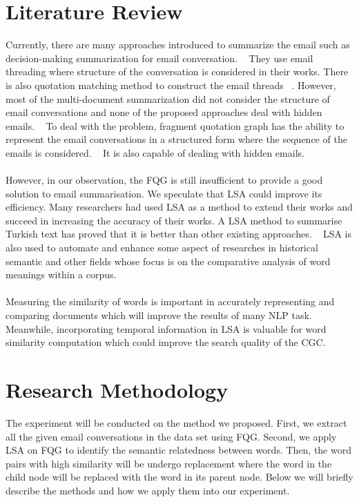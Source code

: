 \documentclass[a4paper, 12pt]{article}
\begin{document}
\section*{Literature Review}
Currently, there are many approaches introduced to summarize the email such as decision-making summarization for email conversation. ~\cite{Wan2004} They use email threading where structure of the conversation is considered in their works. There is also quotation matching method to construct the email threads ~\cite{yeh2006}. However, most of the multi-document summarization did not consider the structure of email conversations and none of the proposed approaches deal with hidden emails. ~\cite{Carenini2007} To deal with the problem, fragment quotation graph has the ability to represent the email conversations in a structured form where the sequence of the emails is considered. ~\cite{Carenini2005} It is also capable of dealing with hidden emails.
\\ \\
However, in our observation, the FQG is still insufficient to provide a good solution to email summarisation. We speculate that LSA could improve its efficiency. Many researchers had used LSA as a method to extend their works and succeed in increasing the accuracy of their works. A LSA method to summarise Turkish text has proved that it is better than other existing approaches. ~\cite{Makbule2010} LSA is also used to automate and enhance some aspect of researches in historical semantic and other fields whose focus is on the comparative analysis of word meanings within a corpus. ~\cite{Sagi2009}
\\ \\
Measuring the similarity of words is important in accurately representing and comparing documents which will improve the results of many NLP task. ~\cite{Yuan2014} Meanwhile, incorporating temporal information in LSA is valuable for word similarity computation which could improve the search quality of the CGC. ~\cite{Yu2011}

\section*{Research Methodology}
The experiment will be conducted on the method we proposed. First, we extract all the given email conversations in the data set using FQG. Second, we apply LSA on FQG to identify the semantic relatedness between words. Then, the word pairs with high similarity will be undergo replacement where the word in the child node will be replaced with the word in its parent node. Below we will briefly describe the methods and how we apply them into our experiment.
\end{document}
